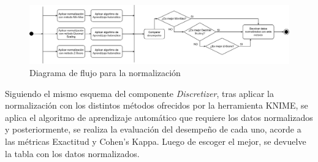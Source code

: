 \begin{figure}[H]
	\centering
	\includegraphics[width=1\linewidth]{"figuras/capi 2/preprocesado/normalizacion.drawio"}
	\caption{Diagrama de flujo para la normalización}
	\label{fig:normalizacion}
\end{figure}

Siguiendo el mismo esquema del componente \textit{Discretizer}, tras aplicar la normalización con los distintos métodos ofrecidos por la herramienta KNIME, se aplica el algoritmo de aprendizaje automático que requiere los datos normalizados y posteriormente, se realiza la evaluación del desempeño de cada uno, acorde a las métricas Exactitud y Cohen's Kappa. Luego de escoger el mejor, se devuelve la tabla con los datos normalizados.


